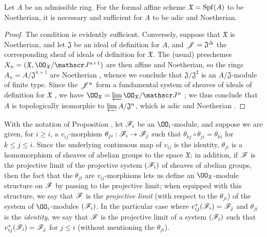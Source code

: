 \begin{cor}[10.6.5]
\label{1.10.6.5}
Let $A$ be an admissible ring.
For the formal affine scheme $\mathfrak{X}=\operatorname{Spf}(A)$ to be Noetherian, it is necessary and sufficient for $A$ to be adic and Noetherian.
\end{cor}

\begin{proof}
\label{proof-1.10.6.5}
The condition is evidently sufficient.
Conversely, suppose that $\mathfrak{X}$ is Noetherian, and let $\mathfrak{J}$ be an ideal of definition for $A$, and $\mathscr{J}=\mathfrak{J}^\Delta$ the corresponding sheaf of ideals of definition for $\mathfrak{X}$.
The (usual) preschemes $X_n=(\mathfrak{X},\OO_\mathfrak{X}/\sh{J}^{n+1})$ are then affine and Noetherian, so the rings $A_n=A/\mathfrak{J}^{n+1}$ are Noetherian , whence we conclude that $\mathfrak{J}/\mathfrak{J}^2$ is an $A/\mathfrak{J}$-module of finite type.
Since the $\mathscr{J}^n$ form a fundamental system of sheaves of ideals of definition for $\mathfrak{X}$ , we have $\OO_\mathfrak{X}=\varprojlim\OO_\mathfrak{X}/\sh{J}^n$ ; we thus conclude  that $A$ is topologically isomorphic to $\varprojlim A/\mathfrak{J}^n$, which is adic and Noetherian .
\end{proof}

\begin{rmk}[10.6.6]
\label{1.10.6.6}
With the notation of Proposition , let $\mathscr{F}_i$ be an $\OO_i$-module, and suppose we are given, for $i\geq i$, a $v_{ij}$-morphism $\theta_{ji}:\sh{F}_i\to\sh{F}_j$ such that $\theta_{kj}\circ\theta_{ji}=\theta_{ki}$ for $k\leq j\leq i$.
Since the underlying continuous map of $v_{ij}$ is the identity, $\theta_{ji}$ is a homomorphism of sheaves of abelian groups to the space $\mathfrak{X}$; in addition, if $\mathscr{F}$ is the projective limit of the projective system $(\mathscr{F}_i)$ of sheaves of abelian groups, then the fact that the $\theta_{ji}$ are $v_{ij}$-morphisms lets us define an $\OO_\mathfrak{X}$-module structure on $\mathscr{F}$ by passing to the projective limit; when equipped with this structure, we say that $\mathscr{F}$ is the \emph{projective limit} (with respect to the $\theta_{ji}$) of the system of $\OO_i$-modules $(\mathscr{F}_i)$.
In the particular case where $v_{ij}^*(\mathscr{F}_i)=\mathscr{F}_j$ and $\theta_{ji}$ is the \emph{identity}, we say that $\mathscr{F}$ is the projective limit of a system $(\mathscr{F}_i)$ such that $v_{ij}^*(\mathscr{F}_i)=\mathscr{F}_j$ for $j\leq i$ (without mentioning the $\theta_{ji}$).
\end{rmk}

